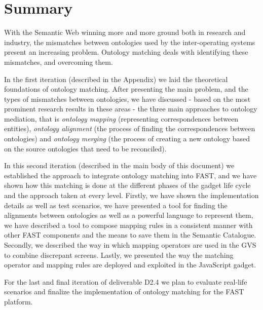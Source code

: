 \documentclass{fast_latex}
\begin{document}



\section{Summary}
\label{sec:summary}
With the Semantic Web winning more and more ground both in research and industry, the mismatches between ontologies used by the inter-operating systems present an increasing problem. Ontology matching deals with identifying these mismatches, and overcoming them. 

In the first iteration (described in the Appendix) we laid the theoretical foundations of ontology matching. After presenting the main problem, and the types of mismatches between ontologies, we have discussed - based on the most prominent research results in these areas - the three main approaches to ontology mediation, that is \textit{ontology mapping} (representing  correspondences between entities), \textit{ontology alignment} (the process of finding the correspondences between ontologies) and \textit{ontology merging }(the process of creating a new ontology based
on the source ontologies that need to be reconciled). 

In this second iteration (described in the main body of this document) we established the approach to integrate ontology matching into FAST, and we have shown how this matching is done at the different phases of the gadget life cycle and the approach taken at every level. Firstly, we have shown the implementation details as well as test scenarios, we have presented a tool for finding the alignments between ontologies as well as a powerful language to represent them, we have described a tool to compose mapping rules in a consistent manner with other FAST components and the means to save them in the Semantic Catalogue. Secondly, we described the way in which mapping operators are used in the GVS to combine discrepant screens. Lastly, we presented the way the matching operator and mapping rules are deployed and exploited in the JavaScript gadget.

For the last and final iteration of deliverable D2.4 we plan to evaluate real-life scenarios and finalize the implementation of ontology matching for the FAST platform.
\end{document}
